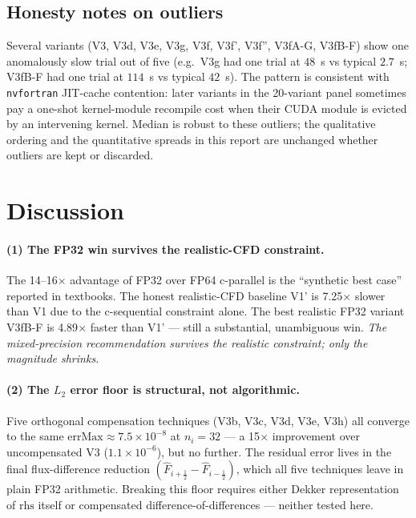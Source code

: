 \documentclass[11pt,a4paper]{article}
\begin{document}
\subsection{Honesty notes on outliers}

Several variants (V3, V3d, V3e, V3g, V3f, V3f', V3f'', V3fA-G,
V3fB-F) show one anomalously slow trial out of five (e.g.\ V3g had
one trial at \(48\)~s vs typical \(2.7\)~s; V3fB-F had one trial at
\(114\)~s vs typical \(42\)~s).  The pattern is consistent with
\texttt{nvfortran} JIT-cache contention: later variants in the
20-variant panel sometimes pay a one-shot kernel-module recompile
cost when their CUDA module is evicted by an intervening kernel.
Median is robust to these outliers; the qualitative ordering and the
quantitative spreads in this report are unchanged whether outliers
are kept or discarded.

\section{Discussion}
\label{sec:discussion}

\paragraph{(1) The FP32 win survives the realistic-CFD constraint.}
The 14--16\(\times\) advantage of FP32 over FP64 c-parallel is the
``synthetic best case'' reported in textbooks. The honest
realistic-CFD baseline V1' is 7.25\(\times\) slower than V1 due to
the c-sequential constraint alone. The best realistic FP32 variant
V3fB-F is 4.89\(\times\) faster than V1' --- still a substantial,
unambiguous win. \emph{The mixed-precision recommendation survives the
realistic constraint; only the magnitude shrinks.}

\paragraph{(2) The \(L_2\) error floor is structural, not algorithmic.}
Five orthogonal compensation techniques (V3b, V3c, V3d, V3e, V3h)
all converge to the same \(\mathrm{errMax} \approx 7.5\times 10^{-8}\)
at \(n_i = 32\) --- a 15\(\times\) improvement over uncompensated V3
(\(1.1\times 10^{-6}\)), but no further. The residual error lives in
the final flux-difference reduction
\((\hat F_{i+\tfrac12} - \hat F_{i-\tfrac12})\), which all five
techniques leave in plain FP32 arithmetic. Breaking this floor
requires either Dekker representation of \(\mathrm{rhs}\) itself or
compensated difference-of-differences --- neither tested here.
\end{document}
